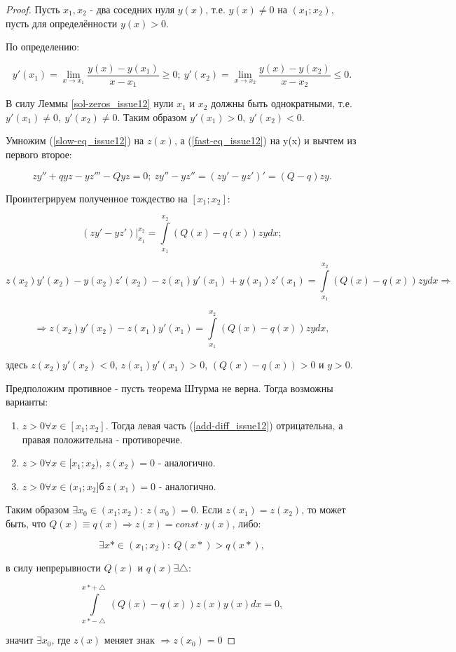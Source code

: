 \begin{proof}
Пусть $x_1, x_2$ - два соседних нуля $y(x)$, т.е. $y(x) \neq 0$ на $(x_1;x_2)$, пусть для определённости $y(x) > 0$.

По определению:

\[y'(x_1) = \lim\limits_{x\rightarrow x_1} \frac{y(x) - y(x_1)}{x - x_1} \geq 0; \: y'(x_2) = \lim\limits_{x\rightarrow x_2} \frac{y(x) - y(x_2)}{x - x_2} \leq 0 .\]

В силу Леммы \ref{sol-zeros_issue12} нули $x_1$ и $x_2$ должны быть однократными, т.е. $y'(x_1) \neq 0, \: y'(x_2) \neq 0$. Таким образом $y'(x_1) > 0, \: y'(x_2) < 0$.

Умножим (\ref{slow-eq_issue12}) на $z(x)$, а (\ref{fast-eq_issue12}) на y(x) и вычтем из первого второе:

\[zy'' + qyz - yz''' - Qyz = 0; \: zy'' - yz'' = (zy'-yz')' = (Q - q)zy.\]

Проинтегрируем полученное тождество на $[x_1;x_2]$:

\[(zy' - yz')\Big\vert_{x_1}^{x_2} = \int\limits_{x_1}^{x_2} (Q(x) - q(x))zydx;\]

\[z(x_2)y'(x_2) - y(x_2)z'(x_2) - z(x_1)y'(x_1) + y(x_1)z'(x_1) = \int\limits_{x_1}^{x_2}(Q(x) - q(x))zydx \Rightarrow\]

\begin{equation}\label{add-diff_issue12} %
\Rightarrow z(x_2)y'(x_2) - z(x_1)y'(x_1) = \int\limits_{x_1}^{x_2}(Q(x) - q(x))zydx,
\end{equation}

здесь $z(x_2)y'(x_2) < 0$, $z(x_1)y'(x_1) > 0$, $(Q(x) - q(x)) > 0$ и $y > 0$.

Предположим противное - пусть теорема Штурма не верна. Тогда возможны варианты:

\begin{enumerate}
\item $z > 0 \forall x \in [x_1;x_2].$ Тогда левая часть (\ref{add-diff_issue12}) отрицательна, а правая положительна - противоречие.

\item $z > 0 \forall x \in [x_1;x_2), \: z(x_2) = 0$ - аналогично.

\item $z > 0 \forall x \in (x_1;x_2]б \: z(x_1) = 0$ - аналогично.
\end{enumerate}

Таким образом $\exists x_0 \in (x_1;x_2): \: z(x_0) = 0$. Если $z(x_1) = z(x_2)$, то может быть, что $Q(x) \equiv q(x) \Rightarrow z(x) = const \cdot y(x)$, либо:

\[\exists x* \in (x_1;x_2): \: Q(x*) > q(x*),\]

в силу непрерывности $Q(x)$ и $q(x) \exists \bigtriangleup:$

\[\int\limits_{x* -\bigtriangleup}^{x* + \bigtriangleup} (Q(x) - q(x))z(x)y(x)dx = 0,\]

значит $\exists x_0$, где $z(x)$ меняет знак $\Rightarrow z(x_0) = 0$
\end{proof}

